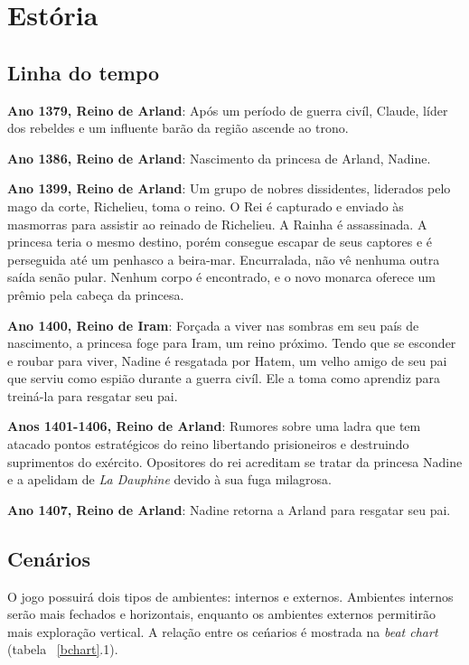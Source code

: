 	\AddToShipoutPicture{\BackgroundPic}

\chapter{Estória}

\section*{Linha do tempo}

\textbf{Ano 1379, Reino de Arland}: Após um período de guerra civíl, Claude, líder dos rebeldes e um influente barão da região ascende ao trono.

\textbf{Ano 1386, Reino de Arland}: Nascimento da princesa de Arland, Nadine.

\textbf{Ano 1399, Reino de Arland}: Um grupo de nobres dissidentes, liderados pelo mago da corte, Richelieu, toma o reino.
	O Rei é capturado e enviado às masmorras para assistir ao reinado de Richelieu. A Rainha é assassinada. A princesa teria o mesmo destino, porém consegue escapar de seus captores e é perseguida até um penhasco a beira-mar. Encurralada, não vê nenhuma outra saída senão pular.
	Nenhum corpo é encontrado, e o novo monarca oferece um prêmio pela cabeça da princesa.

\textbf{Ano 1400, Reino de Iram}: Forçada a viver nas sombras em seu país de nascimento, a princesa foge para Iram, um reino próximo. Tendo que se esconder e roubar para viver, Nadine é resgatada por Hatem, um velho amigo de seu pai que serviu como espião durante a guerra civíl. Ele a toma como aprendiz para treiná-la para resgatar seu pai.

\textbf{Anos 1401-1406, Reino de Arland}: Rumores sobre uma ladra que tem atacado pontos estratégicos do reino libertando prisioneiros e destruindo suprimentos do exército. Opositores do rei acreditam se tratar da princesa Nadine e a apelidam de \emph{La Dauphine} devido à sua fuga milagrosa.

\textbf{Ano 1407, Reino de Arland}:  Nadine retorna a Arland para resgatar seu pai. 

\section*{Cenários}

	O jogo possuirá dois tipos de ambientes: internos e externos. Ambientes internos serão mais fechados e horizontais, enquanto os ambientes externos permitirão mais exploração vertical. A relação entre os ceńarios é mostrada na \emph{beat chart} (tabela ~\ref{bchart}.1). 
	
